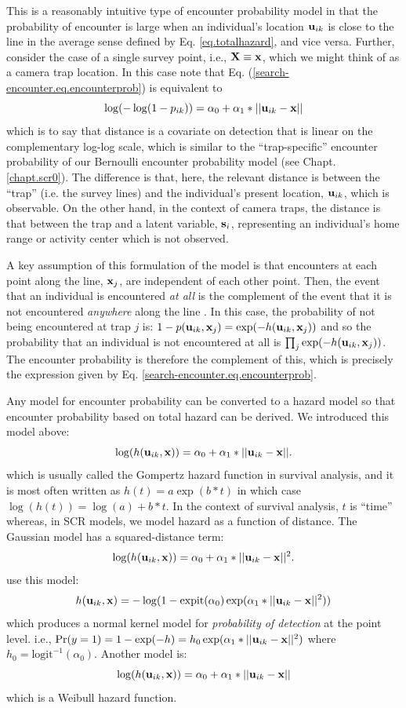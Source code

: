 This is a reasonably intuitive type of encounter probability model in
that the probability of encounter is large when an individual's
location ${\bf u}_{ik}$ is close to the line in the average sense
defined by Eq. \ref{eq.totalhazard}, and vice versa.  Further,
consider the case of a single survey point, i.e., ${\bf X} \equiv {\bf
  x}$, which we might think of as a camera trap location.  In this
case note that Eq. (\ref{search-encounter.eq.encounterprob}) is
equivalent to
\[
\log(-\log(1-p_{ik})) = \alpha_{0} + \alpha_{1}*||{\bf u}_{ik}-{\bf x}||
\]
which is to say that distance is a covariate on detection that is
linear on the complementary log-log scale, which is similar to the
``trap-specific'' encounter probability of our Bernoulli encounter
probability model (see Chapt. \ref{chapt.scr0}).
The difference is that, here, the relevant distance
is between the ``trap'' (i.e. the survey lines) and the individual's
present location, ${\bf u}_{ik}$, which is observable. On the other
hand, in the context of camera traps, the distance is that between the
trap and a latent variable, ${\bf s}_{i}$, representing an
individual's home range or activity center which is not observed.


A key assumption of this formulation of the model is that
encounters at each point along the line, ${\bf x}_{j}$, are
independent of each other point. Then, the event that an individual is
encountered {\it at all} is the complement of the event that it is not
encountered {\it anywhere} along the line \citep{hayes_buckland:1983}.
In this case, the probability of not being encountered at trap $j$ is:
 $1-p({\bf u}_{ik},{\bf x}_{j}) = \exp(-h({\bf u}_{ik},{\bf x}_{j}))$
and so the probability that an individual is not encountered at all is
 $\prod_{j} \exp(-h({\bf u}_{ik},{\bf x}_{j}))$. The encounter
probability is therefore the complement of this, which is precisely
the expression given by Eq. \ref{search-encounter.eq.encounterprob}.


Any model for encounter probability can be converted to a hazard model
so that encounter probability based on total hazard can be derived.
We introduced this model above:
\[
\log(h({\bf u}_{ik},{\bf x})) = \alpha_{0} + \alpha_{1}*||{\bf u}_{ik}-{\bf x}||.
\]
which is usually called the Gompertz hazard function in survival
analysis, and it is most often written as $h(t) = a \exp( b*t)$ in which
case $\log(h(t)) = \log(a) + b*t$. In the context of survival
analysis, $t$ is ``time'' whereas, in SCR models, we model hazard as a
function of distance.
The Gaussian model has a  squared-distance term:
\[
\log(h({\bf u}_{ik},{\bf x})) = \alpha_{0} + \alpha_{1}* ||{\bf u}_{ik}-{\bf x}||^2.
\]
 \citet{borchers_efford:2008} use this model:
\[
h({\bf u}_{ik},{\bf x} ) = -\log(1 - \mbox{expit}(\alpha_{0})
\exp( \alpha_{1}*||{\bf u}_{ik} - {\bf x}||^2 ) )
\]
which produces a normal kernel model for {\it probability of
  detection} at the point level. i.e., $\Pr(y=1) = 1-\exp(-h) = h_{0}
\exp( \alpha_{1}*||{\bf u}_{ik} - {\bf x}||^2 )$ where $h_{0} =
\mbox{logit}^{-1}(\alpha_{0})$.
Another model is:
\[
\log(h({\bf u}_{ik},{\bf x})) = \alpha_{0} + \alpha_{1}*||{\bf u}_{ik}-{\bf x}||
\]
which is a Weibull hazard function.



